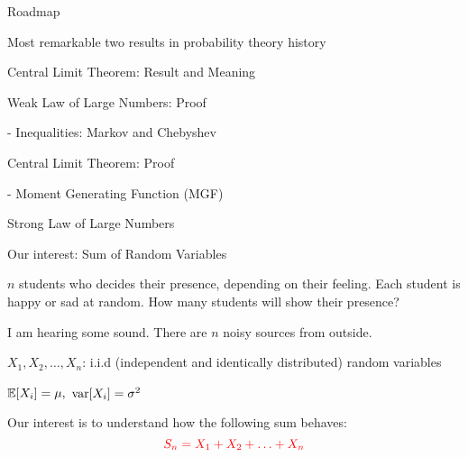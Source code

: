 \begin{frame}{Roadmap}

\plitemsep 0.1in

\bci 
\item Most remarkable two results in probability theory history

\bigskip

\item {}
\item Central Limit Theorem: Result and Meaning
\item Weak Law of Large Numbers: Proof

- Inequalities: Markov and Chebyshev

\item Central Limit Theorem: Proof

- Moment Generating Function (MGF)

\item Strong Law of Large Numbers
\eci 

\end{frame}

\begin{frame}{Our interest: Sum of Random Variables}

\plitemsep 0.1in

\bci 

\item<1->  $n$ students who decides their presence, depending on their feeling. Each student is happy or sad at random. How many students will show their presence?

\item<2->  I am hearing some sound. There are $n$ noisy sources from outside. 

\bigskip

\item<3-> $X_1, X_2, \ldots, X_n$: i.i.d (independent and identically distributed) random variables

\item<4-> $\mathbb{E}[ X_i ] = \mu,$ $\text{var}[ X_i ] = \sigma^2$ 

\item<5-> Our interest is to understand how the following sum behaves:
$$
{\color{red} S_n = X_1 + X_2 + \ldots + X_n}
$$

\eci 

\end{frame}

